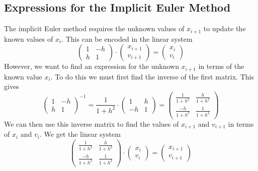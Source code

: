 \documentclass{article}
\begin{document}
\subsection{Expressions for the Implicit Euler Method}
The implicit Euler method requires the unknown values of $x_{i+1}$ to update the known values of $x_i$. This can be encoded in the linear system
\begin{equation}
\begin{pmatrix}
1&-h\\
h&1
\end{pmatrix}
\cdot
\begin{pmatrix}
x_{i+1}\\
v_{i+1}
\end{pmatrix}
=
\begin{pmatrix}
x_i\\
v_i
\end{pmatrix}
\end{equation}
However, we want to find an expression for the unknown $x_{i+1}$ in terms of the known value $x_i$. To do this we must first find the inverse of the first matrix. This gives
\begin{equation}
\begin{pmatrix}
1&-h\\
h&1
\end{pmatrix}
^{-1}
= \frac{1}{1+h^2}\cdot
\begin{pmatrix}
1&h\\
-h&1
\end{pmatrix}
=
\begin{pmatrix}
\frac{1}{1+h^2}&\frac{h}{1+h^2}\\
\frac{-h}{1+h^2}&\frac{1}{1+h^2}
\end{pmatrix}
\end{equation}
We can then use this inverse matrix to find the values of $x_{i+1}$ and $v_{i+1}$ in terms of $x_i$ and $v_i$. We get the linear system
\begin{equation}
\begin{pmatrix}
\frac{1}{1+h^2}&\frac{h}{1+h^2}\\
\frac{-h}{1+h^2}&\frac{1}{1+h^2}
\end{pmatrix}
\cdot
\begin{pmatrix}
x_i\\
v_i
\end{pmatrix}
=
\begin{pmatrix}
x_{i+1}\\
v_{i+1}
\end{pmatrix}
\label{linsys2}
\end{equation}
\end{document}
